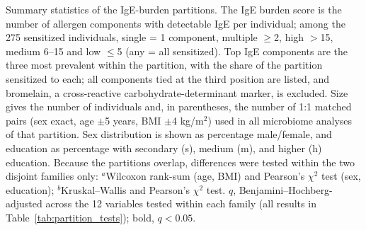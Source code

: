 \begin{table}
\caption{Summary statistics of the IgE-burden partitions. The IgE burden score is the number of allergen components with detectable IgE per individual; among the 275 sensitized individuals, single = 1 component, multiple $\geq$2, high $>$15, medium 6--15 and low $\leq$5 (any = all sensitized). Top IgE components are the three most prevalent within the partition, with the share of the partition sensitized to each; all components tied at the third position are listed, and bromelain, a cross-reactive carbohydrate-determinant marker, is excluded. Size gives the number of individuals and, in parentheses, the number of 1:1 matched pairs (sex exact, age $\pm$5 years, BMI $\pm$4 kg/m$^2$) used in all microbiome analyses of that partition. Sex distribution is shown as percentage male/female, and education as percentage with secondary (s), medium (m), and higher (h) education. Because the partitions overlap, differences were tested within the two disjoint families only: $^{a}$Wilcoxon rank-sum (age, BMI) and Pearson's $\chi^2$ test (sex, education); $^{b}$Kruskal--Wallis and Pearson's $\chi^2$ test. $q$, Benjamini--Hochberg-adjusted across the 12 variables tested within each family (all results in Table~\ref{tab:partition_tests}); bold, $q < 0.05$.\label{tab:igee_partitions}}
\end{table}
